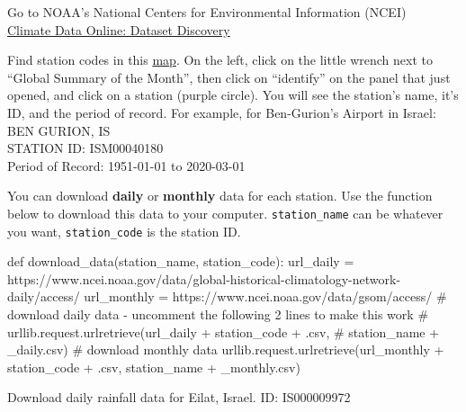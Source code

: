 \documentclass[
  letterpaper,
  DIV=11,
  numbers=noendperiod]{scrreprt}
\newenvironment{Shaded}{\begin{snugshade}}{\end{snugshade}}
\newcommand{\CommentTok}[1]{\textcolor[rgb]{0.37,0.37,0.37}{#1}}
\newcommand{\KeywordTok}[1]{\textcolor[rgb]{0.00,0.23,0.31}{#1}}
\newcommand{\NormalTok}[1]{\textcolor[rgb]{0.00,0.23,0.31}{#1}}
\newcommand{\OperatorTok}[1]{\textcolor[rgb]{0.37,0.37,0.37}{#1}}
\newcommand{\StringTok}[1]{\textcolor[rgb]{0.13,0.47,0.30}{#1}}
\begin{document}
Go to NOAA's National Centers for Environmental Information (NCEI)\\
\href{https://www.ncdc.noaa.gov/cdo-web/datasets}{Climate Data Online:
Dataset Discovery}

Find station codes in this
\href{https://gis.ncdc.noaa.gov/maps/ncei/cdo/monthly}{map}. On the
left, click on the little wrench next to ``Global Summary of the
Month'', then click on ``identify'' on the panel that just opened, and
click on a station (purple circle). You will see the station's name,
it's ID, and the period of record. For example, for Ben-Gurion's Airport
in Israel:\\
BEN GURION, IS\\
STATION ID: ISM00040180\\
Period of Record: 1951-01-01 to 2020-03-01

You can download \textbf{daily} or \textbf{monthly} data for each
station. Use the function below to download this data to your computer.
\texttt{station\_name} can be whatever you want, \texttt{station\_code}
is the station ID.

\begin{Shaded}
\begin{Highlighting}[]
\KeywordTok{def}\NormalTok{ download\_data(station\_name, station\_code):}
\NormalTok{    url\_daily }\OperatorTok{=} \StringTok{\textquotesingle{}https://www.ncei.noaa.gov/data/global{-}historical{-}climatology{-}network{-}daily/access/\textquotesingle{}}
\NormalTok{    url\_monthly }\OperatorTok{=} \StringTok{\textquotesingle{}https://www.ncei.noaa.gov/data/gsom/access/\textquotesingle{}}
    \CommentTok{\# download daily data {-} uncomment the following 2 lines to make this work}
    \CommentTok{\# urllib.request.urlretrieve(url\_daily + station\_code + \textquotesingle{}.csv\textquotesingle{},}
    \CommentTok{\#                           station\_name + \textquotesingle{}\_daily.csv\textquotesingle{})}
    \CommentTok{\# download monthly data}
\NormalTok{    urllib.request.urlretrieve(url\_monthly }\OperatorTok{+}\NormalTok{ station\_code }\OperatorTok{+} \StringTok{\textquotesingle{}.csv\textquotesingle{}}\NormalTok{,}
\NormalTok{                               station\_name }\OperatorTok{+} \StringTok{\textquotesingle{}\_monthly.csv\textquotesingle{}}\NormalTok{)}
\end{Highlighting}
\end{Shaded}

Download daily rainfall data for Eilat, Israel. ID: IS000009972
\end{document}
